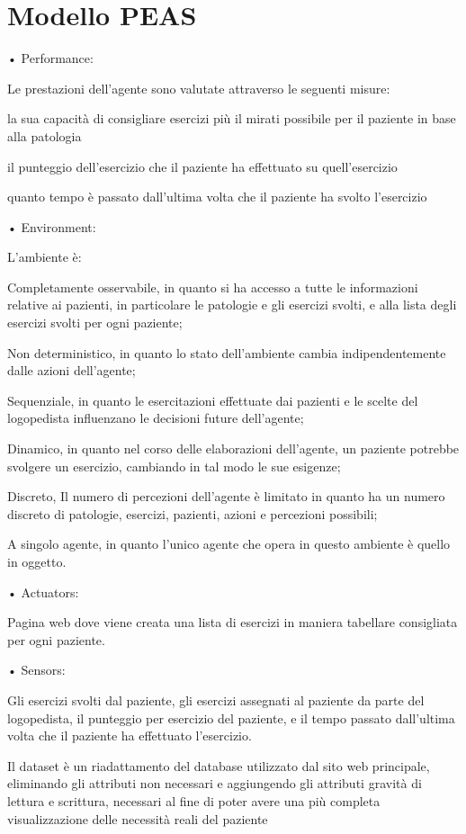 \documentclass{article}
\begin{document}
    \section{Modello PEAS}

    • Performance:

    Le prestazioni dell’agente sono valutate attraverso le seguenti misure:

    la sua capacità di consigliare esercizi più il mirati possibile per il paziente in base alla patologia

    il punteggio dell'esercizio che il paziente ha effettuato su quell'esercizio

    quanto tempo è passato dall'ultima volta che il paziente ha svolto l'esercizio

    • Environment:

    L’ambiente è:

    Completamente osservabile, in quanto si ha accesso a tutte le informazioni relative ai pazienti, in particolare le patologie e gli esercizi svolti, e alla lista degli esercizi svolti per ogni paziente;

    Non deterministico, in quanto lo stato dell’ambiente cambia indipendentemente dalle azioni dell’agente;

    Sequenziale, in quanto le esercitazioni effettuate dai pazienti e le scelte del logopedista influenzano le decisioni future dell’agente;

    Dinamico, in quanto nel corso delle elaborazioni dell’agente, un paziente potrebbe svolgere un esercizio, cambiando in tal modo le sue esigenze;

    Discreto, Il numero di percezioni dell’agente è limitato in quanto ha un numero discreto di patologie, esercizi, pazienti, azioni e percezioni possibili;

    A singolo agente, in quanto l’unico agente che opera in questo ambiente è quello in oggetto.

    • Actuators:

    Pagina web dove viene creata una lista di esercizi in maniera tabellare consigliata per ogni paziente.

    • Sensors:

    Gli esercizi svolti dal paziente, gli esercizi assegnati al paziente da parte del logopedista, il punteggio per esercizio del paziente, e il tempo passato dall'ultima volta che il paziente ha effettuato l'esercizio.

    Il dataset è un riadattamento del database utilizzato dal sito web principale, eliminando gli attributi non necessari e aggiungendo gli attributi gravità di lettura e scrittura, necessari al fine di poter avere una più completa visualizzazione delle necessità reali del paziente
\end{document}
